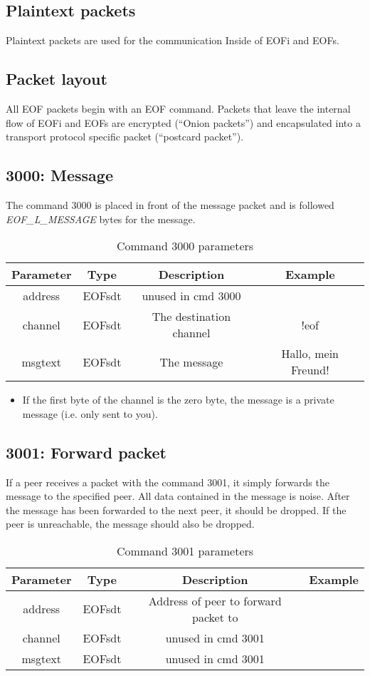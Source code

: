 \documentclass[12pt,a4paper]{book}
\begin{document}
\subsection{Plaintext packets}
Plaintext packets are used for the communication Inside of EOFi and EOFs.
\subsection{Packet layout}
All EOF packets begin with an EOF command. Packets that leave the internal
flow of EOFi and EOFs are encrypted ("`Onion packets"') and encapsulated into
a transport protocol specific packet ("`postcard packet"').
\subsection{3000: Message}
The command 3000 is placed in front of the message packet and is
followed \emph{EOF\_L\_MESSAGE} bytes for the message.
%
\begin{longtable}{|c|c|c|c|}
\caption{Command 3000 parameters}\\
\hline
\textbf{Parameter} & \textbf{Type} & \textbf{Description} & \textbf{Example}\\
\hline
address & EOFsdt & unused in cmd 3000 &\\
\hline
channel & EOFsdt & The destination channel & !eof\\
\hline
msgtext & EOFsdt & The message & Hallo, mein Freund!\\
\hline
\end{longtable}
\begin{itemize}
\item If the first byte of the channel is the zero byte, the message
is a private message (i.e. only sent to you).
\end{itemize}
\subsection{3001: Forward packet}
If a peer receives a packet with the command 3001, it simply forwards
the message to the specified peer. All data contained in the message
is noise. After the message has been forwarded to the next peer, it
should be dropped. If the peer is unreachable, the message should also
be dropped.
%
\begin{longtable}{|c|c|c|c|}
\caption{Command 3001 parameters}\\
\hline
\textbf{Parameter} & \textbf{Type} & \textbf{Description} & \textbf{Example}\\
\hline
address & EOFsdt & Address of peer to forward packet to&\\
\hline
channel & EOFsdt & unused in cmd 3001\\
\hline
msgtext & EOFsdt & unused in cmd 3001\\
\hline
\end{longtable}
\end{document}
